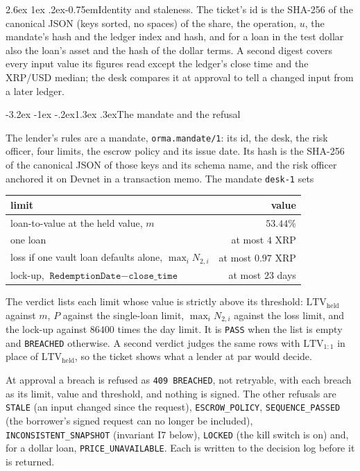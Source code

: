 \documentclass[11pt]{article}
\makeatletter
\renewcommand\subsection{\@startsection{subsection}{2}{\z@}%
  {-3.2ex \@plus -1ex \@minus -.2ex}{1.3ex \@plus .3ex}{\normalfont\large\bfseries}}
\renewcommand\paragraph{\@startsection{paragraph}{4}{\z@}%
  {2.6ex \@plus 1ex \@minus .2ex}{-0.75em}{\normalfont\normalsize\bfseries}}
\theoremstyle{orma}
\theoremstyle{ormaupright}
\makeatother
\begin{document}
\paragraph{Identity and staleness.} The ticket's id is the SHA-256 of the canonical JSON
(keys sorted, no spaces) of the share, the operation, $u$, the mandate's hash and the ledger
index and hash, and for a loan in the test dollar also the loan's asset and the hash of the
dollar terms. A second digest covers every input value its figures read except the ledger's
close time and the XRP/USD median; the desk compares it at approval to tell a changed input
from a later ledger.

\subsection{The mandate and the refusal}

The lender's rules are a mandate, \texttt{orma.mandate/1}: its id, the desk, the risk
officer, four limits, the escrow policy and its issue date. Its hash is the SHA-256 of the
canonical JSON of those keys and its schema name, and the risk officer anchored it on Devnet
in a transaction memo. The mandate
\texttt{desk-1} sets
\begin{center}
\begin{tabular}{lr}
\toprule
limit & value \\
\midrule
loan-to-value at the held value, $m$ & $53.44\%$ \\
one loan & at most $4$ XRP \\
loss if one vault loan defaults alone, $\max_i N_{2,i}$ & at most $0.97$ XRP \\
lock-up, $\texttt{RedemptionDate} - \texttt{close\_time}$ & at most $23$ days \\
\bottomrule
\end{tabular}
\end{center}
The verdict lists each limit whose value is strictly above its threshold: $\mathrm{LTV}_{\mathrm{held}}$
against $m$, $P$ against the single-loan limit, $\max_i N_{2,i}$ against the loss limit, and
the lock-up against $86400$ times the day limit. It is \texttt{PASS} when the list is empty
and \texttt{BREACHED} otherwise. A second verdict judges the same rows with
$\mathrm{LTV}_{1:1}$ in place of $\mathrm{LTV}_{\mathrm{held}}$, so the ticket shows what a
lender at par would decide.

At approval a breach is refused as \texttt{409 BREACHED}, not retryable, with each breach
as its limit, value and threshold, and nothing is signed. The other refusals are
\texttt{STALE} (an input changed since the request), \texttt{ESCROW\_POLICY},
\texttt{SEQUENCE\_PASSED} (the borrower's signed request can no longer be included),
\texttt{INCONSISTENT\_SNAPSHOT} (invariant I7 below), \texttt{LOCKED} (the kill switch is
on) and, for a dollar loan, \texttt{PRICE\_UNAVAILABLE}. Each is written to the decision log
before it is returned.
\end{document}
